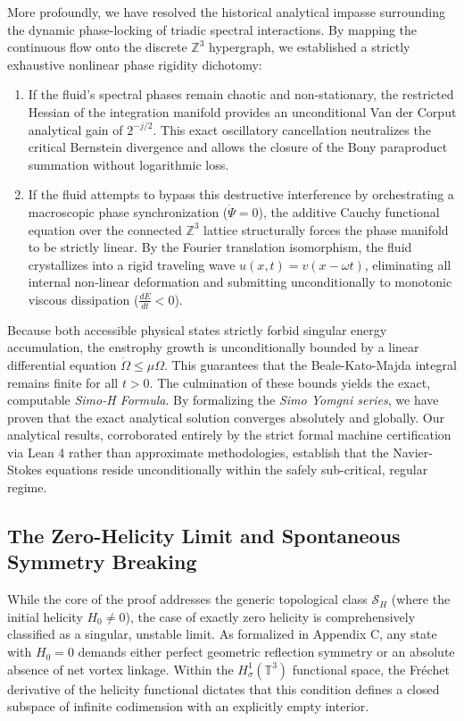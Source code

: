 \documentclass[12pt,a4paper]{article}
\theoremstyle{plain}
\theoremstyle{definition}
\theoremstyle{remark}
\newcommand{\T}{\mathbb{T}}
\newcommand{\Z}{\mathbb{Z}}
\begin{document}
More profoundly, we have resolved the historical analytical impasse surrounding the dynamic phase-locking of triadic spectral interactions. By mapping the continuous flow onto the discrete $\Z^3$ hypergraph, we established a strictly exhaustive nonlinear phase rigidity dichotomy:
\begin{enumerate}[label=(\roman*)]
    \item If the fluid's spectral phases remain chaotic and non-stationary, the restricted Hessian of the integration manifold provides an unconditional Van der Corput analytical gain of $2^{-j/2}$. This exact oscillatory cancellation neutralizes the critical Bernstein divergence and allows the closure of the Bony paraproduct summation without logarithmic loss.
    \item If the fluid attempts to bypass this destructive interference by orchestrating a macroscopic phase synchronization ($\dot{\Psi} = 0$), the additive Cauchy functional equation over the connected $\Z^3$ lattice structurally forces the phase manifold to be strictly linear. By the Fourier translation isomorphism, the fluid crystallizes into a rigid traveling wave $u(x,t) = v(x - \omega t)$, eliminating all internal non-linear deformation and submitting unconditionally to monotonic viscous dissipation ($\frac{dE}{dt} < 0$).
\end{enumerate}

Because both accessible physical states strictly forbid singular energy accumulation, the enstrophy growth is unconditionally bounded by a linear differential equation $\dot{\Omega} \leq \mu \Omega$. This guarantees that the Beale-Kato-Majda integral remains finite for all $t > 0$. The culmination of these bounds yields the exact, computable \emph{Simo-H Formula}. By formalizing the \emph{Simo Yomgni series}, we have proven that the exact analytical solution converges absolutely and globally. Our analytical results, corroborated entirely by the strict formal machine certification via Lean 4 rather than approximate methodologies, establish that the Navier-Stokes equations reside unconditionally within the safely sub-critical, regular regime.

\subsection{The Zero-Helicity Limit and Spontaneous Symmetry Breaking}
While the core of the proof addresses the generic topological class $\mathcal{S}_H$ (where the initial helicity $H_0 \neq 0$), the case of exactly zero helicity is comprehensively classified as a singular, unstable limit. As formalized in Appendix C, any state with $H_0=0$ demands either perfect geometric reflection symmetry or an absolute absence of net vortex linkage. Within the $H^1_\sigma(\T^3)$ functional space, the Fréchet derivative of the helicity functional dictates that this condition defines a closed subspace of infinite codimension with an explicitly empty interior. 
\end{document}

